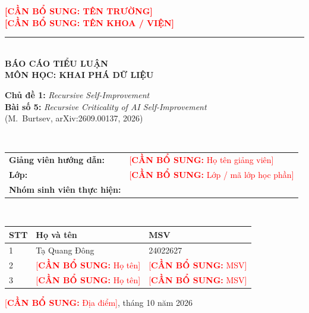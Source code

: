 \documentclass[12pt,a4paper,openany]{report}
\numberwithin{equation}{chapter}   %
\theoremstyle{definition}
\newif\ifdraft \drafttrue          %
\newcommand{\todo}[1]{\ifdraft\textcolor{red}{[\textbf{CẦN BỔ SUNG:} #1]}\fi}
\newcommand{\en}[1]{\textit{#1}}   %
\begin{document}
\begin{titlepage}
\thispagestyle{empty}
\centering
{}
{\large\bfseries \todo{TÊN TRƯỜNG}}\\[2pt]
{\large\bfseries \todo{TÊN KHOA / VIỆN}}\\[6pt]
\rule{0.55\textwidth}{0.6pt}\\[3.2cm]

{\Large\bfseries BÁO CÁO TIỂU LUẬN}\\[10pt]
{\large\bfseries MÔN HỌC: KHAI PHÁ DỮ LIỆU}\\[1.6cm]

\begin{minipage}{0.88\textwidth}
\centering
{\large \textbf{Chủ đề 1:} \en{Recursive Self-Improvement}}\\[6pt]
{\large \textbf{Bài số 5:} \en{Recursive Criticality of AI Self-Improvement}}\\[6pt]
{\normalsize (M.~Burtsev, arXiv:2609.00137, 2026)}
\end{minipage}\\[2.2cm]

\begin{tabular}{@{}p{5.6cm}p{8cm}@{}}
\textbf{Giảng viên hướng dẫn:} & \todo{Họ tên giảng viên}\\[6pt]
\textbf{Lớp:} & \todo{Lớp / mã lớp học phần}\\[6pt]
\textbf{Nhóm sinh viên thực hiện:} & \\
\end{tabular}\\[4pt]

\begin{tabular}{@{}p{1.1cm}p{5.6cm}p{3.4cm}@{}}
\toprule
\textbf{STT} & \textbf{Họ và tên} & \textbf{MSV}\\
\midrule
1 & Tạ Quang Đông & 24022627\\
2 & \todo{Họ tên} & \todo{MSV}\\
3 & \todo{Họ tên} & \todo{MSV}\\
\bottomrule
\end{tabular}

\vfill
{\normalsize \todo{Địa điểm}, tháng 10 năm 2026}
\end{titlepage}

\setcounter{page}{1}
\end{document}
